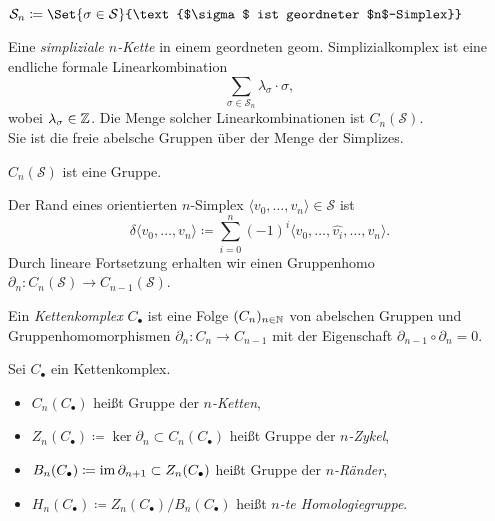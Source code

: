 \documentclass{cheat-sheet}
\newcommand{\angles}[1]{{\langle #1 \rangle}}
\newcommand{\Simpl}{\mathcal{S}} %
\newcommand{\CC}[1]{{#1}_{\bullet}} %
\begin{document}
\begin{nota}
  $\Simpl_n \coloneqq \Set{\sigma \in \Simpl}{\text{$\sigma$ ist geordneter $n$-Simplex}}$
\end{nota}

\begin{defn}
  Eine \emph{simpliziale $n$-Kette} in einem geordneten geom. Simplizialkomplex ist eine endliche formale Linearkombination
  \[ \sum_{\sigma \in \Simpl_n} \lambda_\sigma \cdot \sigma, \]
  wobei $\lambda_\sigma \in \mathbb{Z}$. Die Menge solcher Linearkombinationen ist $C_n(\Simpl)$.\\
  Sie ist die freie abelsche Gruppen über der Menge der Simplizes.
\end{defn}

\begin{bem}
  $C_n(\Simpl)$ ist eine Gruppe.
\end{bem}

\begin{defn}
  Der Rand eines orientierten $n$-Simplex $\angles{v_0, \ldots, v_n} \in \Simpl$ ist
  \[ \delta \angles{v_0, \ldots, v_n} \coloneqq \sum_{i=0}^n (-1)^i \angles{v_0, \ldots, \hat{v_i}, \ldots, v_n}. \]
  Durch lineare Fortsetzung erhalten wir einen Gruppenhomo $\partial_n : C_n(\Simpl) \to C_{n-1}(\Simpl)$.
\end{defn}


\begin{defn}
  Ein \emph{Kettenkomplex} $\CC{C}$ ist eine Folge $(C_n)_{n \in \mathbb{N}}$ von abelschen Gruppen und Gruppenhomomorphismen $\partial_n : C_n \to C_{n-1}$ mit der Eigenschaft $\partial_{n-1} \circ \partial_n = 0$.
\end{defn}

\begin{defn}
  Sei $\CC{C}$ ein Kettenkomplex.
  \begin{itemize}
    \item $C_n(\CC{C})$ heißt Gruppe der \emph{$n$-Ketten},
    \item $Z_n(\CC{C}) \coloneqq \ker \partial_n \subset C_n(\CC{C})$ heißt Gruppe der \emph{$n$-Zykel},
    \item $B_n(\CC{C}) \coloneqq \im \partial_{n+1} \subset Z_n(\CC{C})$ heißt Gruppe der \emph{$n$-Ränder},
    \item $H_n(\CC{C}) \coloneqq Z_n(\CC{C}) / B_n(\CC{C})$ heißt \emph{$n$-te Homologiegruppe}.
  \end{itemize}
\end{defn}
\end{document}
